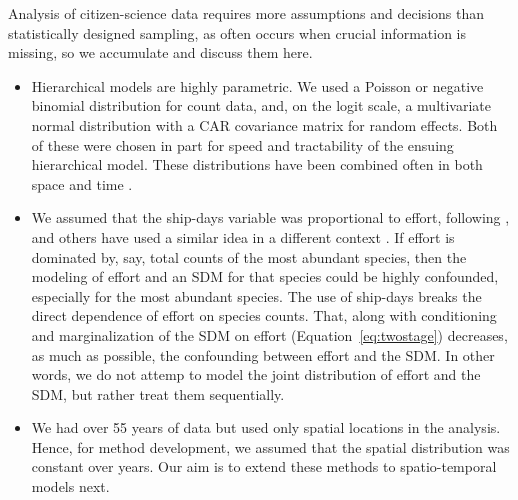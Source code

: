 \documentclass[11pt, titlepage]{article}
\begin{document}
\begin{spacing}{1.9}
\begin{flushleft}
Analysis of citizen-science data requires more assumptions and decisions than statistically designed sampling, as often occurs when crucial information is missing, so we accumulate and discuss them here.

\begin{itemize}

  \item Hierarchical models are highly parametric.  We used a Poisson or negative binomial distribution for count data, and, on the logit scale, a multivariate normal distribution with a CAR covariance matrix for random effects. Both of these were chosen in part for speed and tractability of the ensuing hierarchical model.  These distributions have been combined often in both space \citep[e.g.,][]{wakefield_disease_2007, mohebbi_disease_2014} and time \citep[e.g.,][]{zhu_negative_2011, chen_autoregressive_2016}.
  \item We assumed that the ship-days variable was proportional to effort, following \citet{HimesBoorEtAl2012Stellersealion}, and others have used a similar idea in a different context \citep[e.g.,][]{gomes_species_2018}. If effort is dominated by, say, total counts of the most abundant species, then the modeling of effort and an SDM for that species could be highly confounded, especially for the most abundant species.  The use of ship-days breaks the direct dependence of effort on species counts.  That, along with conditioning and marginalization of the SDM on effort (Equation~\ref{eq:twostage}) decreases, as much as possible, the confounding between effort and the SDM.  In other words, we do not attemp to model the joint distribution of effort and the SDM, but rather treat them sequentially.
  \item We had over 55 years of data but used only spatial locations in the analysis. Hence, for method development, we assumed that the spatial distribution was constant over years.  Our aim is to extend these methods to spatio-temporal models next.


\end{itemize}
\end{flushleft}
\end{spacing}
\end{document}
